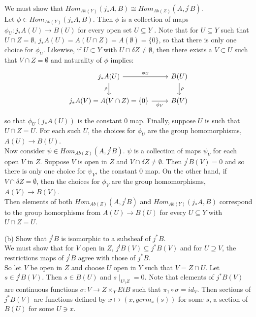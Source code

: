 We must show that $Hom_{Ab(Y)}(j_*A, B) \cong Hom_{Ab(Z)} (A, j^!B)$.\\

Let $\phi \in Hom_{Ab(Y)}(j_*A, B)$. Then $\phi$ is a collection of maps $\phi_U: j_*A(U) \rightarrow B(U)$ for every open set $U \subseteq Y$ . Note that for $U \subseteq Y$ such that $U \cap Z = \emptyset$, $j_*A(U) = A(U \cap Z) = A(\emptyset) = \{0\}$, so that there is only one choice for $\phi_U$. Likewise, if $U \subset Y$ with $U \cap \delta Z \neq \emptyset$, then there exists a $V \subset U$ such that $V \cap Z = \emptyset$ and naturality of $\phi$ implies:
\[
\begin{tikzcd}
 j_*A(U) \arrow[r, "\phi_U"] \arrow[d, "\rho"']
& B(U) \arrow[d, "\rho"] \\
 j_*A(V)= A(V \cap Z) = \{0\} \arrow[r, "\phi_V"']
& B(V)
\end{tikzcd}
\]

so that $\phi_U(j_*A(U))$ is the constant $0$ map. Finally, suppose $U$ is such that $U \cap Z = U$. For each such $U$, the choices for $\phi_U$ are the group homomorphisms, $A(U) \rightarrow B(U)$. \\

Now consider $\psi \in Hom_{Ab(Z)} (A, j^!B)$. $\psi$ is a collection of maps $\psi_V$ for each open $V$ in $Z$. Suppose $V$ is open in $Z$ and $V \cap \delta Z \neq \emptyset$. Then $j^!B(V) = {0}$ and so there is only one choice for $\psi_V$, the constant $0$ map. On the other hand, if $V \cap \delta Z = \emptyset$, then the choices for $\phi_V$ are the group homomorphisms, $A(V) \rightarrow B(V)$.\\

Then elements of both $Hom_{Ab(Z)} (A, j^!B)$ and $Hom_{Ab(Y)}(j_*A, B)$ correspond to the group homorphisms from $A(U) \rightarrow B(U)$ for every $U \subseteq Y$ with $U \cap Z = U$. 


 (b) Show that $j^!B$ is isomorphic to a subsheaf of $j^*B$.\\

We must show that for $V$ open in $Z$, $j^!B(V) \subseteq j^*B(V)$ and for $U \supseteq V$, the restrictions maps of $j^!B$ agree with those of $j^*B$.\\

So let $V$ be open in $Z$ and choose $U$ open in $Y$ such that $V=Z\cap U$. Let $ s \in j^!B(V)$. Then $s \in B(U)$ and $s \mid_{U \setminus Z} =0$. Note that elements of $j^*B(V)$ are continuous functions $\sigma: V \rightarrow Z \times_Y EtB$ such that $\pi_1 \circ \sigma = id_V$. Then sections of $j^*B(V)$ are functions defined by $x \mapsto (x, germ_x(s))$ for some $s$, a section of $B(U)$ for some $U \ni x$.

